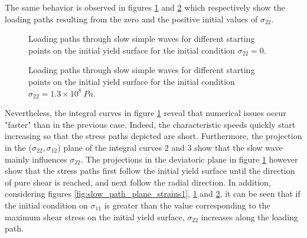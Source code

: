 The same behavior is observed in figures \ref{fig:slow_path_plane_strains2} and \ref{fig:slow_path_plane_strains3} which respectively show the loading paths resulting from the zero and the positive initial values of $\sigma_{22}$.
\begin{figure}[h!]
  \centering
  {}
  {}
  \caption{Loading paths through slow simple waves for different starting points on the initial yield surface for the initial condition $\sigma_{22}=0$.}
  \label{fig:slow_path_plane_strains2}
\end{figure}
\begin{figure}[h!]
  \centering
  {}
  {}
  \caption{Loading paths through slow simple waves for different starting points on the initial yield surface for the initial condition $\sigma_{22}=1.3 \times 10^{8} \: Pa$.}
  \label{fig:slow_path_plane_strains3}
\end{figure}
Nevertheless, the integral curves in figure \ref{fig:slow_path_plane_strains2} reveal that numerical issues occur "faster" than in the previous case.
Indeed, the characteristic speeds quickly start increasing so that the stress paths depicted are short.
Furthermore, the projection in the ($\sigma_{22},\sigma_{12}$) plane of the integral curves $2$ and $3$ show that the slow wave mainly influences $\sigma_{22}$.
The projections in the deviatoric plane in figure \ref{fig:slow_path_plane_strains2} however show that the stress paths first follow the initial yield surface until the direction of pure shear is reached, and next follow the radial direction.
In addition, considering figures \ref{fig:slow_path_plane_strains1}, \ref{fig:slow_path_plane_strains2} and \ref{fig:slow_path_plane_strains3}, it can be seen that if the initial condition on $\sigma_{11}$ is greater than the value corresponding to the maximum shear stress on the initial yield surface, $\sigma_{22}$ increases along the loading path.
